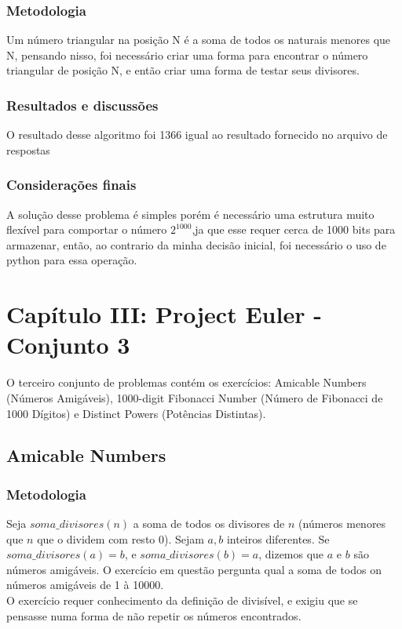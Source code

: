 \documentclass{article}
\begin{document}
        \subsubsection{Metodologia}
        Um número triangular na posição N é a soma de todos os naturais menores que N, pensando nisso, foi necessário criar uma forma para encontrar o número triangular de posição N, e então criar uma forma de testar seus divisores.
        
        \subsubsection{Resultados e discussões}
        O resultado desse algoritmo foi 1366 igual ao resultado fornecido no arquivo de respostas
        
        \subsubsection{Considerações finais}
        A solução desse problema é simples porém é necessário uma estrutura muito flexível para comportar o número $2^1000$,ja que esse requer cerca de 1000 bits para armazenar, então, ao contrario da minha decisão inicial, foi necessário o uso de python para essa operação.
\clearpage

\section{Capítulo III: Project Euler - Conjunto 3}
O terceiro conjunto de problemas contém os exercícios: Amicable Numbers (Números Amigáveis), 1000-digit Fibonacci Number (Número de Fibonacci de 1000 Dígitos) e Distinct Powers (Potências Distintas).
    \subsection{Amicable Numbers}
        
        \subsubsection{Metodologia}
        Seja $soma\_divisores(n)$ a soma de todos os divisores de $n$ (números menores que $n$ que o dividem com resto 0). Sejam $a, b$ inteiros diferentes. Se $soma\_divisores(a) = b$, e $soma\_divisores(b) = a$, dizemos que $a$ e $b$ são números amigáveis. O exercício em questão pergunta qual a soma de todos on números amigáveis de 1 à 10000.\\
        O exercício requer conhecimento da definição de divisível, e exigiu que se pensasse numa forma de não repetir os números encontrados.
        
\end{document}
